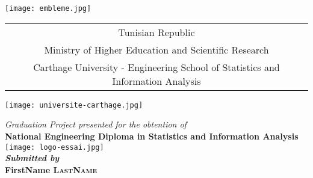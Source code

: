 \documentclass[a4paper, oneside, french, 12pt, final]{extreport}
\title{\reportSubject}
\author{\reportAuthor}
\newcommand{\reportTitle} {%
  \textsc{Graduation Project Report}
}
\newcommand{\reportAuthor} {%
  FirstName \textsc{LastName}%
}
\newcommand{\studyDepartment} {%
  Entreprise d'accueil %
}
\newcommand{\ESSAI} {%
   Engineering School of Statistics and Information Analysis
}
\begin{document}
\thispagestyle{empty}
\begin{titlepage}
\begin{center}


\texttt{[image: embleme.jpg]}\\

{%
  \fontsize{9pt}{9pt}\selectfont%
  \begin{tabular}{c}
    Tunisian Republic\\
    Ministry of Higher Education and Scientific Research \\%
    Carthage University - \ESSAI{}  \\
  \end{tabular}
}

\vspace{10pt}
\texttt{[image: universite-carthage.jpg]} \\


\vspace{10pt} {%
  \renewcommand*{\familydefault}{\defaultFont}
  \fontsize{46pt}{46pt}\selectfont%
}

\vspace{10pt}
\textit{Graduation Project presented for the obtention of
}\\

\vspace{10pt}
\textbf{\large National Engineering Diploma in Statistics and Information Analysis} \\

\texttt{[image: logo-essai.jpg]}\\

\vspace{10pt}
\textbf{\textit{Submitted by}}\\
\vspace{10pt} {%
  \fontsize{18pt}{18pt}\selectfont%
  \textbf{\reportAuthor}\\
}%


\end{center}
\end{titlepage}
\end{document}
